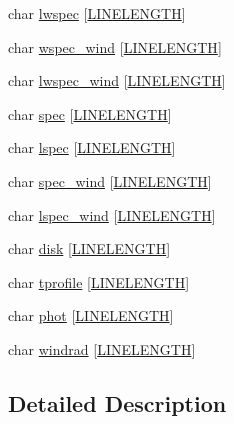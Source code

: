 \begin{DoxyCompactItemize}
\item 
char \hyperlink{structfilenames_a79368c322d08dbd2e3fa460d364ed3a0}{lwspec} \mbox{[}\hyperlink{xlog_8c_a10e8c7b8458375c3dbfbb4010a2aba8c}{L\+I\+N\+E\+L\+E\+N\+G\+TH}\mbox{]}
\item 
char \hyperlink{structfilenames_a06c80950019150200d964f62ff9417f1}{wspec\+\_\+wind} \mbox{[}\hyperlink{xlog_8c_a10e8c7b8458375c3dbfbb4010a2aba8c}{L\+I\+N\+E\+L\+E\+N\+G\+TH}\mbox{]}
\item 
char \hyperlink{structfilenames_a87e29f1b92b3d9f5be4928380029aaed}{lwspec\+\_\+wind} \mbox{[}\hyperlink{xlog_8c_a10e8c7b8458375c3dbfbb4010a2aba8c}{L\+I\+N\+E\+L\+E\+N\+G\+TH}\mbox{]}
\item 
char \hyperlink{structfilenames_a1532ac6d7bebce60d86774d552e0c078}{spec} \mbox{[}\hyperlink{xlog_8c_a10e8c7b8458375c3dbfbb4010a2aba8c}{L\+I\+N\+E\+L\+E\+N\+G\+TH}\mbox{]}
\item 
char \hyperlink{structfilenames_abe876554c7cdd821a6365745cc23079b}{lspec} \mbox{[}\hyperlink{xlog_8c_a10e8c7b8458375c3dbfbb4010a2aba8c}{L\+I\+N\+E\+L\+E\+N\+G\+TH}\mbox{]}
\item 
char \hyperlink{structfilenames_a4e7d0693cd2c2a7359a840d8649a75c1}{spec\+\_\+wind} \mbox{[}\hyperlink{xlog_8c_a10e8c7b8458375c3dbfbb4010a2aba8c}{L\+I\+N\+E\+L\+E\+N\+G\+TH}\mbox{]}
\item 
char \hyperlink{structfilenames_ae7434018e963fbee3799a61f17025e01}{lspec\+\_\+wind} \mbox{[}\hyperlink{xlog_8c_a10e8c7b8458375c3dbfbb4010a2aba8c}{L\+I\+N\+E\+L\+E\+N\+G\+TH}\mbox{]}
\item 
char \hyperlink{structfilenames_a5bf5e6c9f50e525d5df91800b2c1becc}{disk} \mbox{[}\hyperlink{xlog_8c_a10e8c7b8458375c3dbfbb4010a2aba8c}{L\+I\+N\+E\+L\+E\+N\+G\+TH}\mbox{]}
\item 
char \hyperlink{structfilenames_ab591635bb4619345b1367b36cdd2cce6}{tprofile} \mbox{[}\hyperlink{xlog_8c_a10e8c7b8458375c3dbfbb4010a2aba8c}{L\+I\+N\+E\+L\+E\+N\+G\+TH}\mbox{]}
\item 
char \hyperlink{structfilenames_aebb92f2514d1dbb4fce18c2d30871c67}{phot} \mbox{[}\hyperlink{xlog_8c_a10e8c7b8458375c3dbfbb4010a2aba8c}{L\+I\+N\+E\+L\+E\+N\+G\+TH}\mbox{]}
\item 
char \hyperlink{structfilenames_a647feff8c9ae68afbf7fda1112da79de}{windrad} \mbox{[}\hyperlink{xlog_8c_a10e8c7b8458375c3dbfbb4010a2aba8c}{L\+I\+N\+E\+L\+E\+N\+G\+TH}\mbox{]}
\end{DoxyCompactItemize}


\subsection{Detailed Description}


